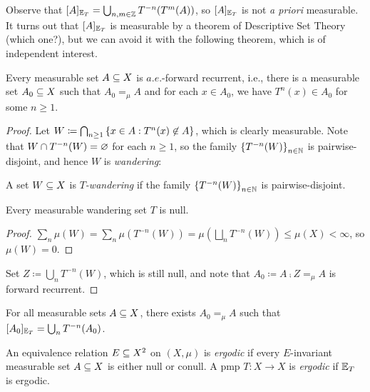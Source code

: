 \documentclass[reqno, twoside]{article}
\begin{document}
    Observe that $[A]_{\mathbb{E}_T}=\bigcup_{n,m\in\mathbb{Z}}T^{-n}(T^m(A))$, so $[A]_{\mathbb{E}_T}$ is not \textit{a priori} measurable. It turns out that $[A]_{\mathbb{E}_T}$ is measurable by a theorem of Descriptive Set Theory (which one?), but we can avoid it with the following theorem, which is of independent interest.

    \begin{theorem}\label{thm:poincare_recurrence}
        Every measurable set $A\subseteq X$ is $a.e.$-forward recurrent, i.e., there is a measurable set $A_0\subseteq X$ such that $A_0=_\mu A$ and for each $x\in A_0$, we have $T^n(x)\in A_0$ for some $n\geq1$.
    \end{theorem}
    \begin{proof}
        Let $W\coloneqq\bigcap_{n\geq1}\left\{x\in A: T^n(x)\not\in A\right\}$, which is clearly measurable. Note that $W\cap T^{-n}(W)=\varnothing$ for each $n\geq1$, so the family $\left\{T^{-n}(W)\right\}_{n\in\mathbb{N}}$ is pairwise-disjoint, and hence $W$ is \textit{wandering}:
        \begin{center}
            \begin{minipage}{0.95\textwidth}
                \begin{definition}
                    A set $W\subseteq X$ is \textit{$T$-wandering} if the family $\left\{T^{-n}(W)\right\}_{n\in\mathbb{N}}$ is pairwise-disjoint.
                \end{definition}
                \begin{lemma}
                    Every measurable wandering set $T$ is null.
                \end{lemma}
                \begin{proof}
                    $\sum_n\mu(W)=\sum_n\mu(T^{-n}(W))=\mu(\bigsqcup_nT^{-n}(W))\leq\mu(X)<\infty$, so $\mu(W)=0$.\qedlem
                \end{proof}
            \end{minipage}
        \end{center}
        Set $Z\coloneqq\bigcup_nT^{-n}(W)$, which is still null, and note that $A_0\coloneqq A\comp Z=_\mu A$ is forward recurrent.
    \end{proof}

    \begin{corollary}\label{cor:saturation_almost_measurable}
        For all measurable sets $A\subseteq X$, there exists $A_0=_\mu A$ such that $[A_0]_{\mathbb{E}_T}=\bigcup_nT^{-n}(A_0)$.
    \end{corollary}

    \begin{definition}
        An equivalence relation $E\subseteq X^2$ on $(X,\mu)$ is \textit{ergodic} if every $E$-invariant measurable set $A\subseteq X$ is either null or conull. A pmp $T:X\to X$ is \textit{ergodic} if $\mathbb{E}_T$ is ergodic.
    \end{definition}
\end{document}
